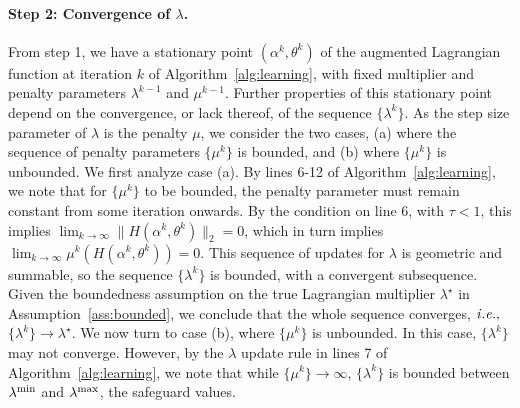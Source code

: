 \documentclass[11pt]{article}
\newcommand{\bsnote}[1]{\noindent\textcolor{red}{\texttt{Bartolomeo: #1}}}
\begin{document}
\begin{appendices}
\paragraph{Step 2: Convergence of $\lambda$.}
From step 1, we have a stationary point $(\alpha^k,\theta^k)$ of the augmented Lagrangian function at iteration $k$ of Algorithm~\ref{alg:learning}, with fixed multiplier and penalty parameters $\lambda^{k-1}$ and $\mu^{k-1}$. Further properties of this stationary point depend on the convergence, or lack thereof, of the sequence $\{\lambda^k\}$. 
As the step size parameter of $\lambda$ is the penalty $\mu$, we consider the two cases, (a) where the sequence of penalty parameters $\{\mu^k\}$ is bounded, and (b) where $\{\mu^k\}$ is unbounded. We first analyze case (a). By lines 6-12 of Algorithm~\ref{alg:learning}, we note that for $\{\mu^k\}$ to be bounded, the penalty parameter must remain constant from some iteration onwards. By the condition on line 6, with $\tau < 1$, this implies $\lim_{k \rightarrow \infty}\|H(\alpha^k,\theta^{k})\|_2 = 0$, which in turn implies $\lim_{k \rightarrow \infty} \mu^k(H(\alpha^k,\theta^{k})) = 0$. This sequence of updates for $\lambda$ is geometric and summable, so the sequence $\{\lambda^k\}$ is bounded, with a convergent subsequence. Given the boundedness assumption on the true Lagrangian multiplier $\lambda^\star$ in Assumption~\ref{ass:bounded}, we conclude 
that the whole sequence converges, ${\it i.e.},$ $\{\lambda^k\} \rightarrow \lambda^\star$. 
We now turn to case (b), where $\{\mu^k\}$ is unbounded. In this case, $\{\lambda^k\}$ may not converge. However, by the $\lambda$ update rule in lines 7 of Algorithm~\ref{alg:learning}, we note that while $\{\mu^k\} \rightarrow \infty$, $\{\lambda^k\}$ is bounded between $\lambda^{\rm{min}}$ and $\lambda^{\rm{max}}$, the safeguard values. 


\end{appendices}
\end{document}
